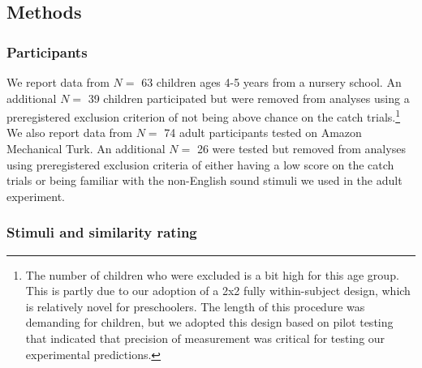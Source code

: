 \documentclass[english,,man]{apa6}
\let\rmarkdownfootnote\footnote%
\def\footnote{\protect\rmarkdownfootnote}
\begin{document}
\hypertarget{methods}{%
\subsection{Methods}\label{methods}}

\hypertarget{participants}{%
\subsubsection{Participants}\label{participants}}

We report data from \(N=\) 63 children ages 4-5 years from a nursery school. An additional \(N=\) 39 children participated but were removed from analyses using a preregistered exclusion criterion of not being above chance on the catch trials.\footnote{The number of children who were excluded is a bit high for this age group. This is partly due to our adoption of a 2x2 fully within-subject design, which is relatively novel for preschoolers. The length of this procedure was demanding for children, but we adopted this design based on pilot testing that indicated that precision of measurement was critical for testing our experimental predictions.} We also report data from \(N=\) 74 adult participants tested on Amazon Mechanical Turk. An additional \(N=\) 26 were tested but removed from analyses using preregistered exclusion criteria of either having a low score on the catch trials or being familiar with the non-English sound stimuli we used in the adult experiment.

\hypertarget{stimuli-and-similarity-rating}{%
\subsubsection{Stimuli and similarity rating}\label{stimuli-and-similarity-rating}}
\end{document}
